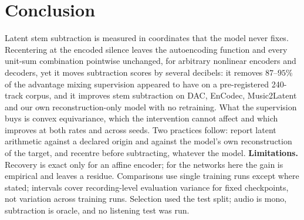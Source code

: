 \documentclass[conference]{IEEEtran}
\begin{document}
\section{Conclusion}\label{sec:conclusion}
Latent stem subtraction is measured in coordinates that the model never
fixes. Recentering at the encoded silence leaves the autoencoding function
and every unit-sum combination pointwise unchanged, for arbitrary nonlinear
encoders and decoders, yet it moves subtraction scores by several decibels:
it removes $87$--$95$\% of the advantage mixing supervision appeared to have
on a pre-registered 240-track corpus, and it improves stem subtraction on
DAC, EnCodec, Music2Latent and our own reconstruction-only model with no
retraining. What the supervision buys is convex equivariance, which the
intervention cannot affect and which improves at both rates and across
seeds. Two practices follow: report latent arithmetic against a declared
origin and against the model's own reconstruction of the target, and recentre
before subtracting, whatever the model.
\textbf{Limitations.} Recovery is exact only for an affine encoder; for the
networks here the gain is empirical and leaves a residue. Comparisons use
single training runs except where stated; intervals cover recording-level
evaluation variance for fixed checkpoints, not variation across training
runs. Selection used the test split; audio is mono, subtraction is oracle,
and no listening test was run.

\clearpage


\end{document}
